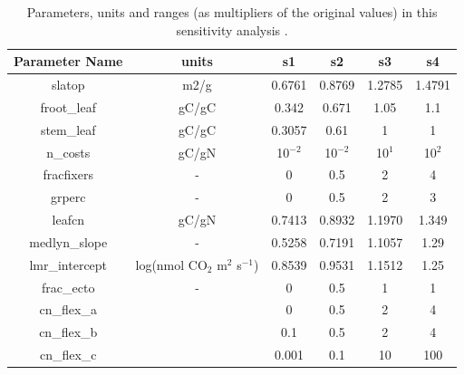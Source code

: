 \usepackage{}\documentclass[draft,linenumbers]{agujournal}
\begin{document}
\begin{table}
\begin{center}
\begin{tabular}{ |c|c|c|c|c|c| } 
 \hline
 Parameter Name & units & s1 &s2 & s3 & s4\\
  \hline
 slatop & m2/g & 0.6761 & 0.8769 &1.2785 &1.4791\\ 
 froot\_leaf & gC/gC &  0.342 &0.671 &1.05 & 1.1\\
 stem\_leaf  & gC/gC & 0.3057 &0.61 &1 &1\\ 
 n\_costs    & gC/gN &10$^{-2}$ &10$^{-2}$&  10$^{1}$& 10$^{2}$\\
 fracfixers  & - & 0 &0.5 & 2 & 4 \\
  grperc  &  - &0 & 0.5& 2 & 3\\
  leafcn  & gC/gN &0.7413 & 0.8932 & 1.1970  & 1.349\\
  
     medlyn\_slope  &- &0.5258 & 0.7191 & 1.1057  &1.29\\
      lmr\_intercept &log(nmol CO$_{2}$ m$^{2}$ s$^{-1}$) &0.8539 & 0.9531 & 1.1512& 1.25\\
      frac\_ecto &- & 0 &0.5& 1 & 1 \\
      cn\_flex\_a & &0 &0.5 & 2  &4\\
      cn\_flex\_b & &0.1 & 0.5 & 2  & 4\\
      cn\_flex\_c & &0.001 & 0.1 & 10 & 100\\
\hline
\end{tabular}
\end{center}
\caption{Parameters, units and ranges (as multipliers of the original values) in this sensitivity analysis .}
\label{table_ranges}
\end{table}
\end{document}
